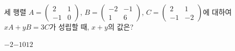 \hspace*{2mm}\begin{minipage}[t]{\dimexpr\linewidth-2mm\relax}\vspace{0pt}
세 행렬 $A=\begin{pmatrix} 2 & 1 \\ -1 & 0 \end{pmatrix}$, $B=\begin{pmatrix} -2 & -1 \\ 1 & 6 \end{pmatrix}$, $C=\begin{pmatrix} 2 & 1 \\ -1 & -2 \end{pmatrix}$에 대하여 $xA+yB=3C$가 성립할 때, $x+y$의 값은? 
\begin{choices32}{$-2$}{$-1$}{$0$}{$1$}{$2$}\end{choices32}\end{minipage}
